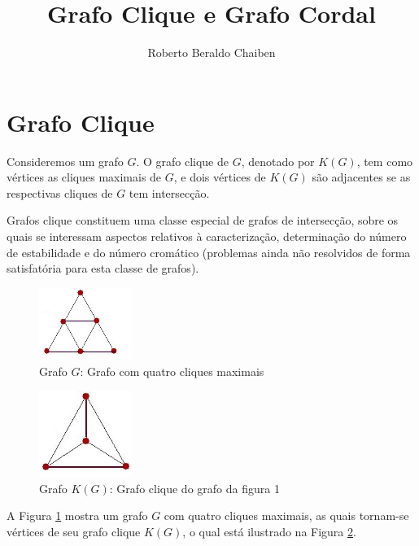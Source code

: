 \documentclass{article}
\title{Grafo Clique e Grafo Cordal}
\author{Roberto Beraldo Chaiben}
\begin{document}
\maketitle
\tableofcontents
\listofalgorithms


\newpage



\section{Grafo Clique}

Consideremos um grafo $G$. O grafo clique de
$G$, denotado por $K(G)$, tem como vértices as
cliques maximais de $G$, e dois vértices de $K(G)$ são adjacentes
se as respectivas cliques de $G$ tem intersecção.


Grafos clique constituem uma classe especial de grafos de intersecção, sobre
os quais se interessam aspectos relativos à caracterização, determinação do
número de estabilidade e do
número cromático (problemas ainda não resolvidos de
forma satisfatória para esta classe de grafos).


\begin{figure}[h]
    \center
    \caption{Grafo $G$: Grafo com quatro cliques maximais}
    \label{fig:1}
    \includegraphics[width=3cm]{img/clique01.jpg}
\end{figure}

\begin{figure}[h]
    \center
    \caption{Grafo $K(G)$: Grafo clique do grafo da figura 1}
    \label{fig:2}
    \includegraphics[width=3cm]{img/clique02.jpg}
\end{figure}

A Figura \ref{fig:1} mostra um grafo $G$ com quatro
cliques maximais, as quais tornam-se
vértices de seu grafo clique $K(G)$, o qual
está ilustrado na Figura \ref{fig:2}.
\end{document}
